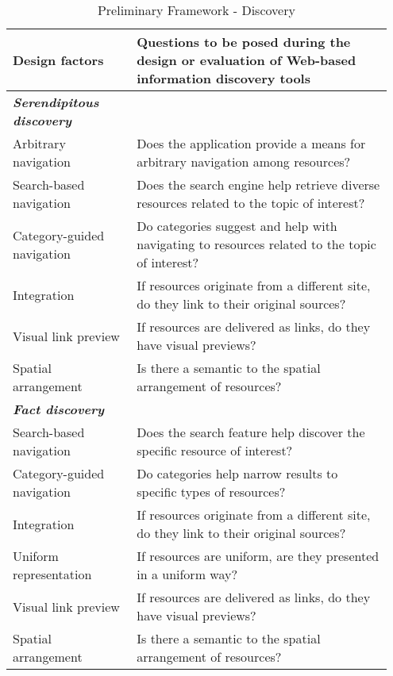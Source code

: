 \begin{table*}[ht!]
\caption{Preliminary Framework - Discovery}
\centering
\label{table:old_framework_discovery}
\footnotesize
\begin{tabular}{|p{0.31\linewidth}|p{0.64\linewidth}|}
\hline
\textbf{\small{Design factors}}   & \textbf{\small{Questions to be posed during the design or evaluation of Web-based information discovery tools 
}}  \\
\hline
\emph{\textbf{Serendipitous discovery}}     &                                                                                                           \\

Arbitrary navigation         & Does the application provide a means for arbitrary navigation among resources?                              \\
Search-based navigation      & Does the search engine help retrieve diverse resources related to the topic of interest?               \\
Category-guided navigation & Do categories suggest and help with navigating to resources related to the topic of interest?           \\
Integration                  & If resources originate from a different site, do they link to their original sources?                   \\
Visual link preview               & If resources are delivered as links, do they have visual previews?                                                                        \\
Spatial arrangement          & Is there a semantic to the spatial arrangement of resources?                                                    \\

\emph{\textbf{Fact discovery}}                &                                                                                                           \\
Search-based navigation      & Does the search feature help discover the specific resource of interest?                                  \\
Category-guided navigation & Do categories help narrow results to specific types of resources?                                   \\
Integration                  & If resources originate from a different site, do they link to their original sources?                   \\
Uniform representation       & If resources are uniform, are they presented in a uniform way? \\
Visual link preview               & If resources are delivered as links, do they have visual previews?                                                                        \\
Spatial arrangement          & Is there a semantic to the spatial arrangement of resources?                                                    \\


\end{tabular}
\end{table*}
